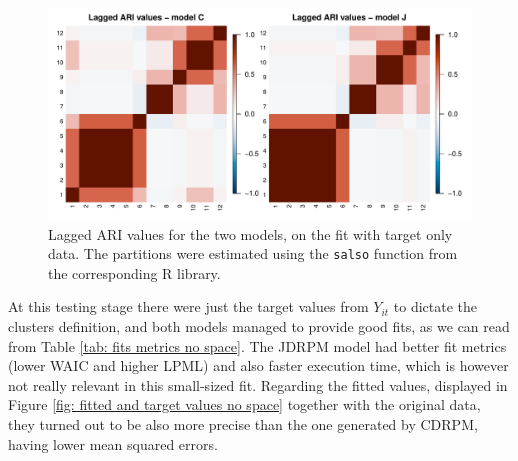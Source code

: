 \documentclass[12pt,	%
	a4paper,		%
	twoside,		%
	openright,		%
	titlepage,%
	]{book}
\theoremstyle{definition}
\newcommand{\mjline}[1]{\texttt{#1}}
\begin{document}
\begin{figure}[!htb]
    \centering
    \includegraphics[width=1\linewidth]{Testing/Assessing correctness/no space/ari.pdf}
    \caption[Lagged ARI values of CDRPM and JDRPM fits, target values only]{Lagged ARI values for the two models, on the fit with target only data. The partitions were estimated using the \mjline{salso} function from the corresponding R library.}
    \label{fig:ari no space}
\end{figure}


At this testing stage there were just the target values from $Y_{it}$ to dictate the clusters definition, and both models managed to provide good fits, as we can read from Table \ref{tab: fits metrics no space}. The JDRPM model had better fit metrics (lower WAIC and higher LPML) and also faster execution time, which is however not really relevant in this small-sized fit. Regarding the fitted values, displayed in Figure \ref{fig: fitted and target values no space} together with the original data, they turned out to be also more precise than the one generated by CDRPM, having lower mean squared errors.
\end{document}
